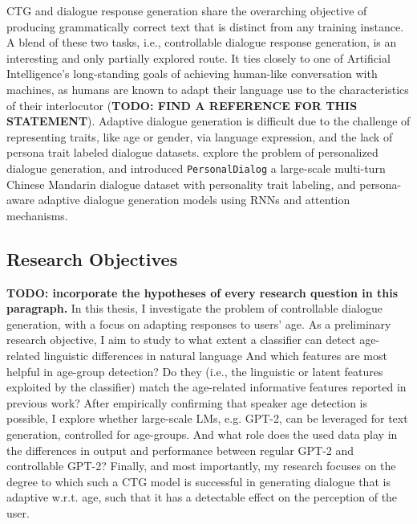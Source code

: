 CTG and dialogue response generation share the overarching objective of producing grammatically correct text that is distinct from any training instance. A blend of these two tasks, i.e., controllable dialogue response generation, is an interesting and only partially explored route. It ties closely to one of Artificial Intelligence's long-standing goals of achieving human-like conversation with machines, as humans are known to adapt their language use to the characteristics of their interlocutor (\textbf{TODO: FIND A REFERENCE FOR THIS STATEMENT}). Adaptive dialogue generation is difficult due to the challenge of representing traits, like age or gender, via language expression, and the lack of persona trait labeled dialogue datasets. \cite{zheng2019personalized} explore the problem of personalized dialogue generation, and introduced \texttt{PersonalDialog} a large-scale multi-turn Chinese Mandarin dialogue dataset with personality trait labeling, and persona-aware adaptive dialogue generation models using RNNs and attention mechanisms. 

\subsection{Research Objectives}
\textbf{TODO: incorporate the hypotheses of every research question in this paragraph.}
In this thesis, I investigate the problem of controllable dialogue generation, with a focus on adapting responses to users' age. As a preliminary research objective, I aim to study to what extent a classifier can detect age-related linguistic differences in natural language And which features are most helpful in age-group detection? Do they (i.e., the linguistic or latent features exploited by the classifier) match the age-related informative features reported in previous work? 
After empirically confirming that speaker age detection is possible, I explore whether large-scale LMs, e.g. GPT-2, can be leveraged for text generation, controlled for age-groups. And what role does the used data play in the differences in output and performance between regular GPT-2 and controllable GPT-2?
Finally, and most importantly, my research focuses on the degree to which such a CTG model is successful in generating dialogue that is adaptive w.r.t. age, such that it has a detectable effect on the perception of the user.




